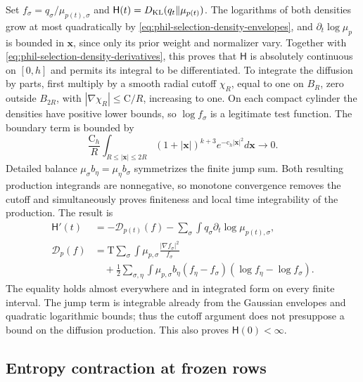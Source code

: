 Set \(f_\sigma=q_\sigma/\mu_{p(t),\sigma}\) and
\(\mathsf H(t)=D_{\mathrm{KL}}(q_t\Vert\mu_{p(t)})\).
The logarithms of both densities grow at most quadratically by
\cref{eq:phil-selection-density-envelopes}, and
\(\partial_t\log\mu_p\) is bounded in \(\mathbf x\), since only its prior
weight and normalizer vary. Together with
\cref{eq:phil-selection-density-derivatives}, this proves that
\(\mathsf H\) is absolutely continuous on \([0,h]\) and permits its
integral to be differentiated.
To integrate the diffusion by parts, first multiply by a smooth radial
cutoff \(\chi_R\), equal to one on \(B_R\), zero outside \(B_{2R}\),
with \(|\nabla\chi_R|\le\mathrm C/R\), increasing to one.
On each compact cylinder the densities have positive lower bounds, so
\(\log f_\sigma\) is a legitimate test function. The boundary term is
bounded by
\[
 \frac{\mathrm C_h}{R}\int_{R\le|\mathbf x|\le2R}
       (1+|\mathbf x|)^{k+3}e^{-\mathrm c_h|\mathbf x|^2}d\mathbf x
 \longrightarrow0.
\]
Detailed balance \(\mu_\sigma b_\eta=\mu_\eta b_\sigma\) symmetrizes the
finite jump sum. Both resulting production integrands are nonnegative,
so monotone convergence removes the cutoff and simultaneously proves
finiteness and local time integrability of the production. The result is
\begin{equation}
 \begin{aligned}
 \mathsf H'(t)&=-\mathscr D_{p(t)}(f)
               -\sum_\sigma\int q_\sigma\partial_t\log\mu_{p(t),\sigma},\\
 \mathscr D_p(f)&=\mathrm T\sum_\sigma\int\mu_{p,\sigma}
                         \frac{|\nabla f_\sigma|^2}{f_\sigma}\\
 &\quad+\frac12\sum_{\sigma,\eta}\int\mu_{p,\sigma}b_\eta
                  (f_\eta-f_\sigma)(\log f_\eta-\log f_\sigma).
 \end{aligned}
\label{eq:phil-selection-entropy-identity}
\end{equation}
The equality holds almost everywhere and in integrated form on every finite
interval. The jump term is integrable already from the Gaussian envelopes
and quadratic logarithmic bounds; thus the cutoff argument does not
presuppose a bound on the diffusion production. This also proves
\(\mathsf H(0)<\infty\).

\subsection*{Entropy contraction at frozen rows}

